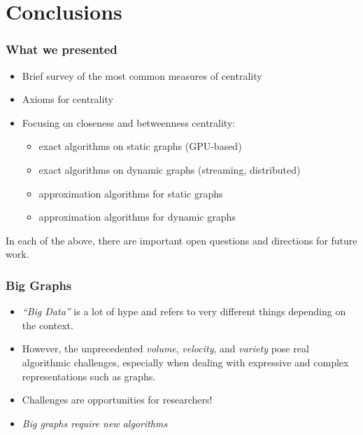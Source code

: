 \section{Conclusions}

\begin{frame}
  \frametitle{What we presented}
  \begin{itemize}
    \pause
    \item Brief survey of the most common measures of centrality
    \item Axioms for centrality
    \item Focusing on closeness and betweenness centrality:
      \begin{itemize}
        \item exact algorithms on static graphs (GPU-based)
        \item exact algorithms on dynamic graphs (streaming, distributed)
        \item approximation algorithms for static graphs
        \item approximation algorithms for dynamic graphs
    \end{itemize}
  \end{itemize}
  In each of the above, there are important open questions and directions for
  future work.
\end{frame}

\begin{frame}
  \frametitle{Big Graphs}
  \begin{itemize}
    \pause
    \item \emph{``Big Data''} is a lot of hype and refers to very different
      things depending on the context.
    \pause
    \item However, the unprecedented \emph{volume}, \emph{velocity}, and
      \emph{variety} pose real algorithmic challenges, especially when dealing
      with expressive and complex representations such as graphs.
    \pause
    \item Challenges are opportunities for researchers!
    \pause
    \item \emph{Big graphs require new algorithms}
  \end{itemize}
\end{frame}


